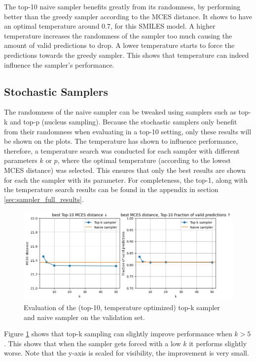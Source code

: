 The top-10 naive sampler benefits greatly from its randomness, by performing better than the greedy sampler according to the MCES distance.
It shows to have an optimal temperature around $0.7$, for this SMILES model.
A higher temperature increases the randomness of the sampler too much causing the amount of valid predictions to drop.
A lower temperature starts to force the predictions towards the greedy sampler.
This shows that temperature can indeed influence the sampler's performance.

\subsection{Stochastic Samplers}

The randomness of the naive sampler can be tweaked using samplers such as top-k and top-p (nucleus sampling).
Because the stochastic samplers only benefit from their randomness when evaluating in a top-10 setting, only these results will be shown on the plots.
The temperature has shown to influence performance, therefore, a temperature search was conducted for each sampler with different parameters $k$ or $p$, where the optimal temperature (according to the lowest MCES distance) was selected.
This ensures that only the best results are shown for each the sampler with its parameter.
For completeness, the top-1, along with the temperature search results can be found in the appendix in section \ref{sec:sampler_full_results}.

\begin{figure}[h]
    \centering
    \includegraphics[width=1.0\textwidth]{figures/results/samplers/top-k.png}
    \caption{Evaluation of the (top-10, temperature optimized) top-k sampler and naive sampler on the validation set.}
    \label{fig:top-k}
\end{figure}

Figure \ref{fig:top-k} shows that top-k sampling can slightly improve performance when $k > 5$.
This shows that when the sampler gets forced with a low $k$ it performs slightly worse. 
Note that the y-axis is scaled for visibility, the improvement is very small.

